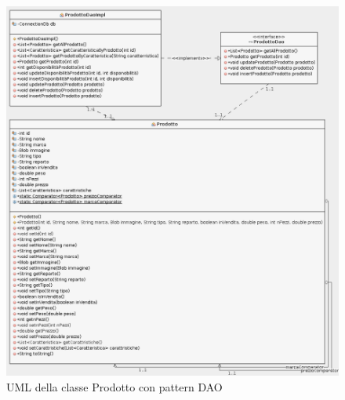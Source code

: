 \documentclass{article}
\begin{document}
\begin{figure}[h!]
	\centering
	\includegraphics[width=\textwidth]{UmlProdotto.png}
	\caption{UML della classe Prodotto con pattern DAO}
	\label{fig:UmlProdotto}
\end{figure}
\clearpage
\end{document}
